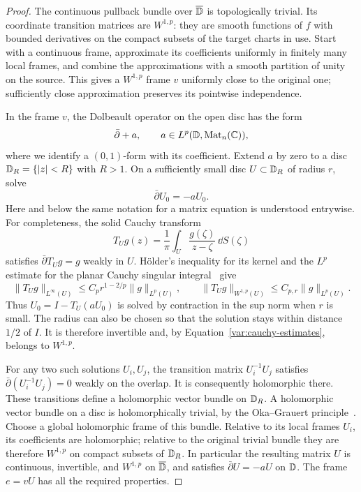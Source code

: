 \begin{proof}
The continuous pullback bundle over $\overline{\mathbb D}$ is topologically
trivial.  Its coordinate transition matrices are $W^{1,p}$: they are
smooth functions of $f$ with bounded derivatives on the compact subsets
of the target charts in use.  Start with a continuous frame, approximate
its coefficients uniformly in finitely many local frames, and combine
the approximations with a smooth partition of unity on the source.
This gives a $W^{1,p}$ frame $v$ uniformly close to the original one;
sufficiently close approximation preserves its pointwise independence.

In the frame $v$, the Dolbeault operator on the open disc has the form
\[
 \bar\partial+a,
 \qquad a\in L^p(\mathbb D,\operatorname{Mat}_n(\mathbb C)),
\]
where we identify a $(0,1)$-form with its coefficient.  Extend $a$ by
zero to a disc $\mathbb D_R=\{|z|<R\}$ with $R>1$.  On a sufficiently small
disc $U\subset\mathbb D_R$ of radius $r$, solve
\begin{equation}\label{var:local-gauge}
 \bar\partial U_0=-aU_0.
\end{equation}
Here and below the same notation for a matrix equation is understood
entrywise.  For completeness, the solid Cauchy transform
\[
 T_Ug(z)=\frac1\pi\int_U\frac{g(\zeta)}{z-\zeta}\,\dd S(\zeta)
\]
satisfies $\bar\partial T_Ug=g$ weakly in $U$.  H\"older's inequality
for its kernel and the $L^p$ estimate for the planar Cauchy singular
integral~\cite[Section~4.1 of the authors' preprint]{SukhovTumanov2016} give
\begin{equation}\label{var:cauchy-estimates}
 \|T_Ug\|_{L^\infty(U)}
       \le C_p r^{1-2/p}\|g\|_{L^p(U)},
 \qquad
 \|T_Ug\|_{W^{1,p}(U)}\le C_{p,r}\|g\|_{L^p(U)}.
\end{equation}
Thus $U_0=I-T_U(aU_0)$ is solved by contraction in the sup norm when
$r$ is small.  The radius can also be chosen so that the solution stays
within distance $1/2$ of $I$.  It is therefore invertible and, by
Equation~\eqref{var:cauchy-estimates}, belongs to $W^{1,p}$.

For any two such solutions $U_i,U_j$, the transition matrix
$U_i^{-1}U_j$ satisfies $\bar\partial(U_i^{-1}U_j)=0$ weakly on the
overlap.  It is consequently holomorphic there.  These transitions
define a holomorphic vector bundle on $\mathbb D_R$.  A holomorphic vector
bundle on a disc is holomorphically trivial, by the Oka--Grauert
principle~\cite{Grauert1958,ForstnericPrezelj2000}.  Choose a global holomorphic frame of
this bundle.  Relative to its local frames $U_i$, its coefficients are
holomorphic; relative to the original trivial bundle they are therefore
$W^{1,p}$ on compact subsets of $\mathbb D_R$.  In particular the resulting
matrix $U$ is continuous, invertible, and $W^{1,p}$ on $\overline{\mathbb D}$,
and satisfies $\bar\partial U=-aU$ on $\mathbb D$.  The frame $e=vU$ has all
the required properties.
\end{proof}

